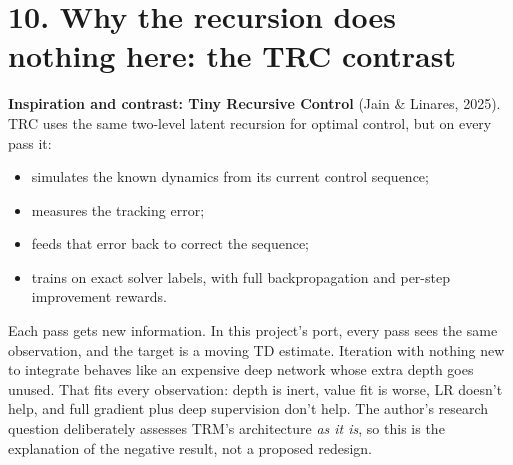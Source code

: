 \documentclass[11pt]{article}
\begin{document}
\section*{10. Why the recursion does nothing here: the TRC contrast}



\textbf{Inspiration and contrast: Tiny Recursive Control} (Jain \& Linares, 2025). TRC uses the same two-level latent recursion for optimal control, but on every pass it:

\begin{itemize}
\item simulates the known dynamics from its current control sequence;
\item measures the tracking error;
\item feeds that error back to correct the sequence;
\item trains on exact solver labels, with full backpropagation and per-step improvement rewards.
\end{itemize}



Each pass gets new information. In this project's port, every pass sees the same observation, and the target is a moving TD estimate. Iteration with nothing new to integrate behaves like an expensive deep network whose extra depth goes unused. That fits every observation: depth is inert, value fit is worse, LR doesn't help, and full gradient plus deep supervision don't help. The author's research question deliberately assesses TRM's architecture \emph{as it is}, so this is the explanation of the negative result, not a proposed redesign.



\medskip{}
\end{document}
